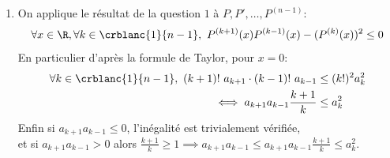 \documentclass{book}
\begin{document}
\begin{enumerate}
		\underline{Conclusion}: Pour tout $k\in \crblanc{1}{n-1}$, $P^{(k)}$ est à racines réelles.\\\\
		\underline{\textbf{Deuxième méthode: théorème de Gauss-Lucas}}\\
		l'exercice \ref{Gauss-Lucas} montre que si $P$ est à racines réelles alors $P'$ l'est aussi. Une récurrence similaire à celle de l'autre méthode permet de conclure.
		\item On applique le résultat de la question $1$ à $P,P',\dots,P^{(n-1)}$:
		$$\forall x\in \R,\forall k\in \crblanc{1}{n-1},\ P^{(k+1)}(x)P^{(k-1)}(x)-(P^{(k)}(x))^2\leq 0$$
		En particulier d'après la formule de Taylor, pour $x=0$:
		\begin{align*}
			\forall k\in \crblanc{1}{n-1},\ (k+1)!\ a_{k+1}\cdot (k-1)!\ a_{k-1}&\leq (k!)^2a_k^2\\
			\iff a_{k+1}a_{k-1}\displaystyle\frac{k+1}{k}&\leq a_k^2
		\end{align*}
		Enfin si $a_{k+1}a_{k-1}\leq 0$, l'inégalité est trivialement vérifiée,\\
		et si $a_{k+1}a_{k-1}>0$ alors $\displaystyle\frac{k+1}{k}\geq 1\implies a_{k+1}a_{k-1}\leq a_{k+1}a_{k-1}\displaystyle\frac{k+1}{k}\leq a_k^2$.
	\end{enumerate}
	
\end{document}

